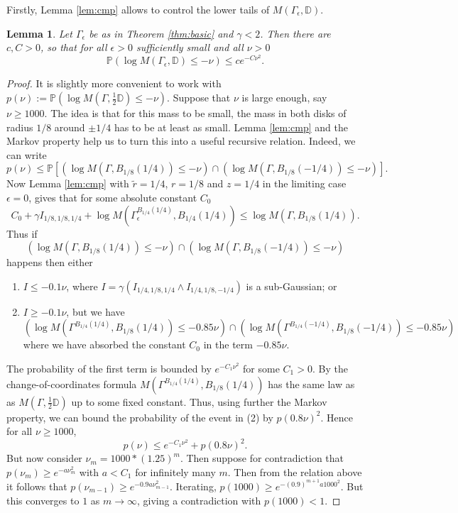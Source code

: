 \documentclass[11pt]{amsart}
\newtheorem{lemma}[thm]{Lemma}
\newcommand{\D}{\mathbb D}
\renewcommand{\P}{\mathbb P}
\renewcommand{\1}{\mathbf 1}
\newcommand{\eps}{\epsilon}
\begin{document}
Firstly, Lemma \ref{lem:cmp} allows to control the lower tails of $M(\Gamma_\eps, \D)$.

\begin{lemma}\label{lem:tail}
Let $\Gamma_\eps$ be as in Theorem \ref{thm:basic} and $\gamma < 2$. Then there are $c, C > 0$, so that for all $\eps >0$ sufficiently small and all $\nu > 0$ $$\P\left(\log M(\Gamma_\eps, \D) \leq - \nu\right) \leq ce^{-C\nu^2}.$$
\end{lemma}

\begin{proof}
It is slightly more convenient to work with $p(\nu) := \P\left(\log M(\Gamma, \frac{1}{2}\D) \leq - \nu\right)$. Suppose that $\nu$ is large enough, say $\nu \geq 1000$. The idea is that for this mass to be small, the mass in both disks of radius $1/8$ around $\pm 1/4$ has to be at least as small. Lemma \ref{lem:cmp} and the Markov property help us to turn this into a useful recursive relation. Indeed, we can write 
$$p(\nu) \leq \P\left[\left(\log M(\Gamma, B_{1/8}(1/4)) \leq - \nu\right)\cap\left(\log M(\Gamma, B_{1/8}(-1/4)) \leq - \nu\right) \right].$$
Now Lemma \ref{lem:cmp} with $\tilde r = 1/4$, $r = 1/8$ and $z = 1/4$ in the limiting case $\eps = 0$, gives that for some absolute constant $C_0$
$$C_0 + \gamma I_{1/8,1/8,1/4} + \log M(\Gamma_\eps^{B_{1/4}(1/4)}, B_{1/4}(1/4)) \leq \log M(\Gamma, B_{1/8}(1/4)).$$
Thus if 
$$\left(\log M(\Gamma, B_{1/8}(1/4)) \leq - \nu\right)\cap\left(\log M(\Gamma, B_{1/8}(-1/4)) \leq - \nu\right)$$
happens then either
\begin{enumerate}
\item $I \leq -0.1\nu$, where $I =  \gamma (I_{1/4,1/8,1/4} \wedge I_{1/4,1/8, -1/4})$ is a sub-Gaussian; or
\item $I \geq -0.1\nu$, but we have
$$\left(\log M(\Gamma^{B_{1/4}(1/4)}, B_{1/8}(1/4)) \leq -0.85\nu\right)\cap\left(\log M(\Gamma^{B_{1/4}(-1/4)}, B_{1/8}(-1/4)) \leq -0.85\nu\right)$$
where we have absorbed the constant $C_0$ in the term $-0.85\nu$.
\end{enumerate}

The probability of the first term is bounded by $e^{-C_1\nu^2}$ for some $C_1 > 0$. By the change-of-coordinates formula $M(\Gamma^{B_{1/4}(1/4)},B_{1/8}(1/4))$ has the same law as as $M(\Gamma,\frac{1}{2}\D)$ up to some fixed constant. Thus, using further the Markov property, we can bound the probability of the event in (2) by $p(0.8\nu)^2$. Hence for all $\nu \geq 1000$,
$$p(\nu) \leq e^{-C_1\nu^2} + p(0.8\nu)^2.$$
But now consider $\nu_m = 1000*(1.25)^m$. Then suppose for contradiction that $p(\nu_m) \geq e^{-a\nu_m^2}$ with $a < C_1$ for infinitely many $m$. Then from the relation above it follows that $p(\nu_{m-1}) \geq e^{-0.9a\nu_{m-1}^2}$. Iterating, $p(1000) \geq e^{-(0.9)^{m+1}a1000^2}$. But this converges to $1$ as $m \to \infty$, giving a contradiction with $p(1000) < 1$. 
\end{proof}
\end{document}
